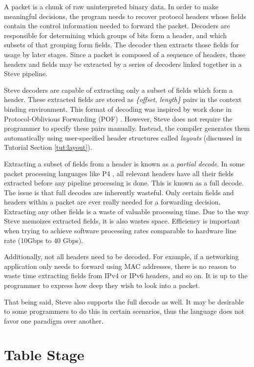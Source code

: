 A packet is a chunk of raw uninterpreted binary data.
In order to make meaningful decisions, the program needs to
recover protocol headers whose fields contain the control
information needed to forward the packet.
Decoders are responsible for determining which
groups of bits form a header, and which subsets of that grouping form fields. 
The decoder then extracts those fields for usage by later stages.
Since a packet is composed of a sequence of headers, those headers and fields
may be extracted by a series of decoders linked together in a Steve pipeline.

Steve decoders are capable of extracting only a subset of fields
which form a header. 
These extracted fields are stored as \emph{\{offset, length\}} pairs in
the context binding environment. 
This format of decoding was inspired by work done in Protocol-Oblivious Forwarding 
(POF) \cite{pof, pof_fis, pof_impl}.
However, Steve does not require the programmer to specify these pairs manually.
Instead, the compiler generates them automatically using user-specified header
structures called \emph{layouts} (discussed in Tutorial Section \ref{tut:layout}).

Extracting a subset of fields from a header is known as a \emph{partial decode}.
In some packet processing languages like P4 \cite{p4_spec, p4_spec2}, all
relevant headers have all their fields extracted before any pipeline processing
is done. 
This is known as a full decode.
The issue is that full decodes are inherently wasteful.
Only certain fields and headers within a packet are ever really needed for a
forwarding decision.
Extracting any other fields is a waste of valuable processing time.
Due to the way Steve memoizes extracted fields, it is also wastes space.
Efficiency is important when trying
to achieve software processing rates comparable to hardware line rate 
(10Gbps to 40 Gbps).

Additionally, not all headers need to be decoded. For
example, if a networking application only needs to forward using MAC addresses,
there is no reason to waste time extracting fields from IPv4 or IPv6 headers,
and so on. It is up to the programmer to express how deep they wish to look into
a packet.

That being said, Steve also supports the full decode as well. It may be desirable to
some programmers to do this in certain scenarios, thus the language does not
favor one paradigm over another.

\section{Table Stage} \label{table_desc}

